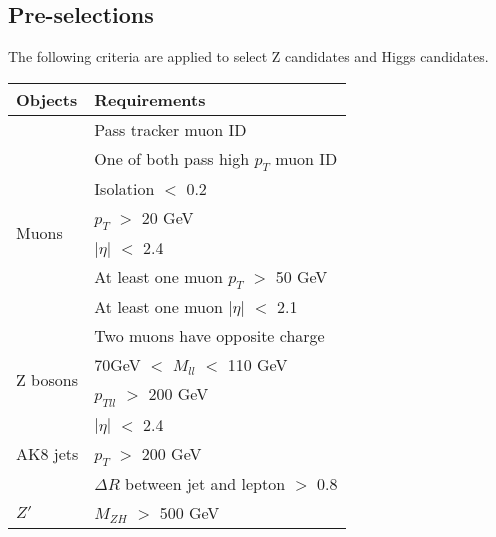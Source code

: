 \documentclass[a0,portrait]{a0poster}
\begin{document}
\begin{center}
\begin{multicols}{3}
    \begin{textbox}
      \section*{\color{FireBrick} Pre-selections}

      The following criteria are applied to select Z candidates and Higgs candidates.

      \begin{center}
        \begin{footnotesize}
          \begin{tabular}[t]{ | p{6cm} | p{14.5cm} | }
            \hline
            \bf Objects
            & \bf Requirements                         \\
            \hline
            \multirow{8}{*}{Muons}
            & Pass tracker muon ID                     \\
            & One of both pass high $p_T$ muon ID      \\
            & Isolation $<$ 0.2                        \\
            & $p_T$ $>$ 20 GeV                         \\
            & $|\eta|$ $<$ 2.4                         \\
            & At least one muon $p_T$ $>$ 50 GeV       \\
            & At least one muon $|\eta|$ $<$ 2.1       \\
            & Two muons have opposite charge           \\
            \hline
            \multirow{2}{*}{Z bosons}
            & 70GeV $<$ $M_{ll}$ $<$ 110 GeV           \\
            & $p_{Tll}$ $>$ 200 GeV                    \\
            \hline
            \multirow{3}{*}{AK8 jets}
            & $|\eta|$ $<$ 2.4                          \\
            & $p_T$ $>$ 200 GeV                         \\
            & $\Delta R$ between jet and lepton $>$ 0.8 \\
            \hline
            $Z'$
            & $M_{ZH}$ $>$ 500 GeV                      \\
            \hline
          \end{tabular}
          \label{tab:select}
        \end{footnotesize}
      \end{center}
    \end{textbox}


\end{multicols}
\end{center}
\end{document}
